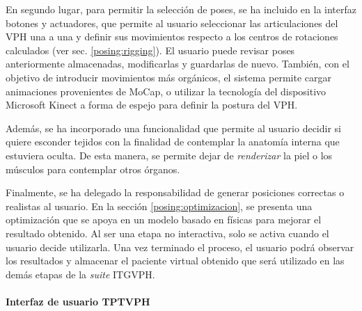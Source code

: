 En segundo lugar, para permitir la selección de poses, se ha incluido en la interfaz botones y actuadores, que permite al usuario  seleccionar las articulaciones del \ac{VPH} una a una y definir sus movimientos respecto a los centros de rotaciones calculados (ver sec. \ref{posing:rigging}). El usuario puede revisar poses anteriormente almacenadas, modificarlas y guardarlas de nuevo. También, con el objetivo de introducir movimientos más orgánicos, el sistema permite cargar animaciones provenientes de \ac{MoCap}, o utilizar la tecnología del dispositivo Microsoft Kinect a forma de espejo para definir la postura del \ac{VPH}.

Además, se ha incorporado una funcionalidad que permite al usuario decidir si quiere esconder tejidos con la finalidad de contemplar la anatomía interna que estuviera oculta. De esta manera, se permite dejar de \emph{renderizar} la piel o los músculos para contemplar otros órganos.%

Finalmente, se ha delegado la responsabilidad de generar posiciones correctas o realistas al usuario. En la sección \ref{posing:optimizacion}, se presenta una optimización que se apoya en un modelo basado en físicas para mejorar el resultado obtenido. Al ser una etapa no interactiva, solo se activa cuando el usuario decide utilizarla. Una vez terminado el proceso, el usuario podrá observar los resultados y almacenar el paciente virtual obtenido que será utilizado en las demás etapas de la \emph{suite} \ac{ITGVPH}.  


\paragraph{Interfaz de usuario \ac{TPTVPH}}\mbox{}\\

